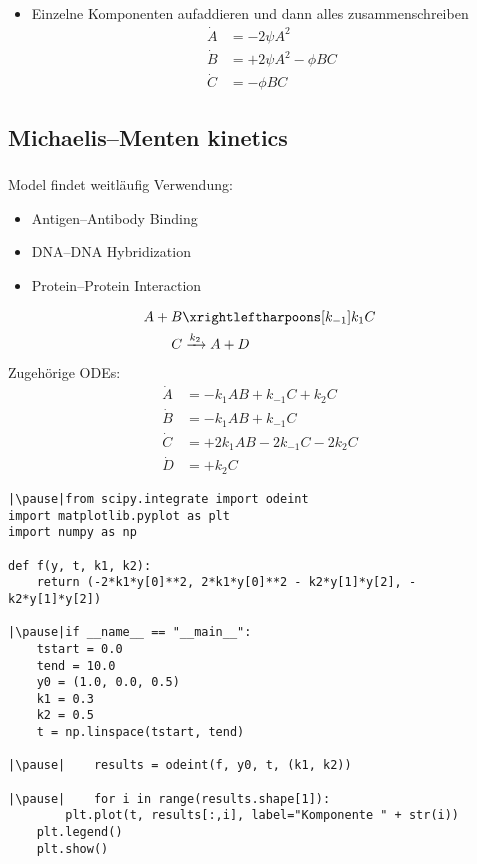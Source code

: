 \begin{frame}[fragile]
    \begin{itemize}
        \item[ ] Einzelne Komponenten aufaddieren und dann alles zusammenschreiben
        \pause
        \begin{align}
            \dot{A} &= -2\psi A^2\\
            \dot{B} &= +2\psi A^2 -\phi BC\\
            \dot{C} &= -\phi BC
        \end{align}
    \end{itemize}
\end{frame}


\subsection{Michaelis–Menten kinetics}
\begin{frame}
    \frametitle{\insertsubsection}
    Model findet weitläufig Verwendung:
    \begin{itemize}[<+->]
        \item Antigen–Antibody Binding
        \item DNA–DNA Hybridization
        \item Protein–Protein Interaction
    \end{itemize}
    \begin{align}
        A+B&\xrightleftharpoons[k_{-1}]{k_1}C\\
        C&\xrightarrow{k_2}A+D
    \end{align}
    Zugehörige ODEs:
    \begin{align}
        \dot{A} &= -k_1AB + k_{-1}C + k_2C\\
        \dot{B} &= -k_1AB + k_{-1}C\\
        \dot{C} &= +2k_1AB - 2k_{-1}C - 2k_2C\\
        \dot{D} &= +k_2C
    \end{align}
\end{frame}


\begin{frame}[fragile]
    \begin{verbatim}
|\pause|from scipy.integrate import odeint
import matplotlib.pyplot as plt
import numpy as np

def f(y, t, k1, k2):
    return (-2*k1*y[0]**2, 2*k1*y[0]**2 - k2*y[1]*y[2], - k2*y[1]*y[2])

|\pause|if __name__ == "__main__":
    tstart = 0.0
    tend = 10.0
    y0 = (1.0, 0.0, 0.5)
    k1 = 0.3
    k2 = 0.5
    t = np.linspace(tstart, tend)
    
|\pause|    results = odeint(f, y0, t, (k1, k2))

|\pause|    for i in range(results.shape[1]):
        plt.plot(t, results[:,i], label="Komponente " + str(i))
    plt.legend()
    plt.show()
    \end{verbatim}

\end{frame}